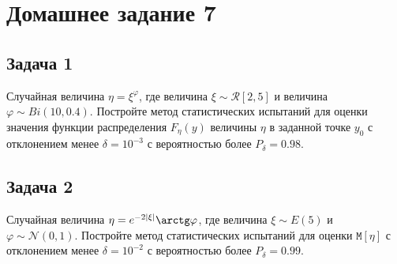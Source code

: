 \documentclass[a4paper,12pt]{article}
\newcommand{\modulus}[1]{\left | #1 \right |}
\newcommand{\expectation}[1]{\mathtt{M} \left[ #1 \right]}
\newif\ifsolutions
\begin{document}
\ifsolutions
    Решение:

    Зависимость $y = x^{2.7} e^{-1.2x} + \varepsilon$.
\fi

\section*{Домашнее задание 7}

\subsection*{Задача 1}

Случайная величина $\eta = \xi^ \varphi$, где величина $\xi \sim \mathcal{R} \left[ 2, 5 \right]$ и величина $\varphi \sim Bi(10, 0.4)$. Постройте
метод статистических испытаний для оценки значения функции распределения $F_\eta(y)$ величины $\eta$ в заданной точке $y_0$ с отклонением менее
$\delta = 10^{-3}$ с вероятностью более $P_\delta = 0.98$.

\ifsolutions
    Решение:

    $(\xi_1, \dots, \xi_n)$ --- выборка из $Bi(10, 0.4)$, $(\varphi_1, \dots, \varphi_n)$ --- выборка из $\mathcal{R} \left[ 2, 5 \right]$,
    оценка:
    \begin{gather*}
        \eta_k = \xi_k \ln \varphi_k , \\
        \varepsilon_k = \left \{
        \begin{array}{ll}
            1, \eta_k < y_0 \\
            0, \eta_k \ge y_0
        \end{array}
        \right . , \\
        F_\eta(y_0) \approx \frac{1}{n} \sum_{k=1}^n \varepsilon_k .
    \end{gather*}
    Требуемый объём выборок:
    \begin{gather*}
        n \ge \widehat{n}_\delta
        = \left( K^{-1} ( P_\delta ) \right)^2 \frac{1}{\delta^2}
        \approx 1.5174^2 \frac{1}{10^{-6}}
        \approx 2.302503 \cdot 10^6
        = 2 302 503 .
    \end{gather*}

\fi

\subsection*{Задача 2}

Случайная величина $\eta = e^{- 2 \modulus{\xi}} \arctg \varphi$, где величина $\xi \sim E(5)$ и $\varphi \sim \mathcal{N}(0,1)$. Постройте
метод статистических испытаний для оценки $\expectation{\eta}$ с отклонением менее $\delta = 10^{-2}$ с вероятностью более $P_\delta = 0.99$.
\end{document}
